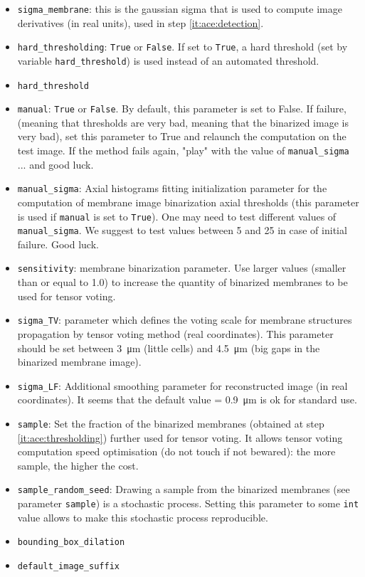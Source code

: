 \begin{itemize}
\itemsep -0.5ex
\item \texttt{sigma\_membrane}:
  this is the gaussian sigma that is used to compute image derivatives
  (in real units), used in step \ref{it:ace:detection}.
\item \texttt{hard\_thresholding}:
  \texttt{True} or \texttt{False}.
  If set to \texttt{True}, a hard threshold (set by variable 
  \texttt{hard\_threshold}) is used instead of an automated threshold.
\item \texttt{hard\_threshold}
\item \texttt{manual}: \texttt{True} or \texttt{False}.
  By default, this parameter is set to False. If failure, 
  (meaning that thresholds are very bad, meaning that the binarized 
  image is very bad), set this parameter to True and relaunch the
  computation on the test image. If the method fails again, "play" 
  with the value of \texttt{manual\_sigma} ... and good luck.
\item \texttt{manual\_sigma}:
  Axial histograms fitting initialization parameter for the computation 
  of membrane image binarization axial thresholds (this parameter is 
  used if \texttt{manual} is set to \texttt{True}). 
  One may need to test different values of 
  \texttt{manual\_sigma}. We suggest to test values between 5 and 25 
  in case of initial failure. Good luck.
\item \texttt{sensitivity}: membrane binarization parameter.
  Use larger values (smaller than or equal to 1.0) to increase 
  the quantity of binarized membranes to be used for tensor voting.
\item \texttt{sigma\_TV}: 
  parameter which defines the voting scale for membrane structures 
  propagation by tensor voting method (real coordinates). This parameter
  should be set between \SI{3}{\micro m} (little cells) and 
  \SI{4.5}{\micro m} (big gaps in 
  the binarized membrane image).
\item \texttt{sigma\_LF}:
  Additional smoothing parameter for reconstructed image 
  (in real coordinates).
  It seems that the default value = \SI{0.9}{\micro m} is 
  ok for standard use.
\item \texttt{sample}:
  Set the fraction of the binarized membranes (obtained at step  
  \ref{it:ace:thresholding}) further used for tensor voting.
  It allows tensor voting computation speed optimisation (do not 
  touch if not bewared): the more sample, the higher the cost.
\item \texttt{sample\_random\_seed}:
  Drawing a sample from the binarized membranes (see parameter 
  \texttt{sample}) is a stochastic process. Setting this parameter 
  to some \texttt{int} value allows to make this stochastic process 
  reproducible.
\item \texttt{bounding\_box\_dilation}
\item \texttt{default\_image\_suffix}
\end{itemize}










